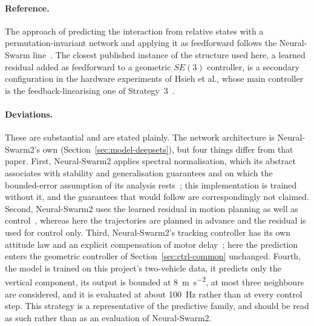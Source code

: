 \paragraph{Reference.} The approach of predicting the interaction from relative states with a
permutation-invariant network and applying it as feedforward follows the Neural-Swarm
line~\cite{shi2020neuralswarm,shi2022neuralswarm2}.
The closest published instance of the structure used here, a learned residual added as
feedforward to a geometric $SE(3)$ controller, is a secondary configuration in the hardware
experiments of Hsieh et al., whose main controller is the feedback-linearising one of
Strategy~3~\cite{hsieh2026flatness}.

\paragraph{Deviations.} These are substantial and are stated plainly. The network architecture is
Neural-Swarm2's own (Section~\ref{sec:model-deepsets}), but four things differ from that paper.
First, Neural-Swarm2 applies spectral normalisation, which its abstract associates with stability
and generalisation guarantees and on which the bounded-error assumption of its analysis
rests~\cite{shi2022neuralswarm2}; this implementation is trained without it, and the guarantees
that would follow are correspondingly not claimed. Second, Neural-Swarm2 uses the learned residual
in motion planning as well as control~\cite{shi2022neuralswarm2}, whereas here the trajectories are
planned in advance and the residual is used for control only. Third, Neural-Swarm2's tracking
controller has its own attitude law and an explicit compensation of motor delay~\cite{shi2022neuralswarm2};
here the prediction enters the geometric controller of Section~\ref{sec:ctrl-common} unchanged.
Fourth, the model is trained on this project's two-vehicle data, it predicts only the vertical
component, its output is bounded at \SI{8}{\metre\per\second\squared}, at most three neighbours are
considered, and it is evaluated at about \SI{100}{\hertz} rather than at every control step. This
strategy is a representative of the predictive family, and should be read as such rather than as an
evaluation of Neural-Swarm2.

